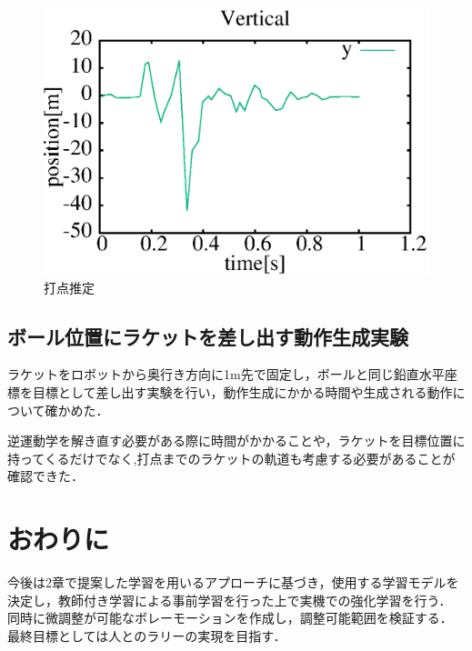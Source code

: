 \documentclass[twocolumn]{preport}
\begin{document}
\begin{figure}[tbh]
\begin{center}
\begin{minipage}{0.35\columnwidth}
   \includegraphics[width=\columnwidth]{est_y_316.eps}
   \caption{打点推定}
   \label{figure:est_graph}
  \end{minipage}
 \end{center}
\end{figure}


\subsection{ボール位置にラケットを差し出す動作生成実験}
ラケットをロボットから奥行き方向に1m先で固定し，ボールと同じ鉛直水平座標を目標として差し出す実験を行い，動作生成にかかる時間や生成される動作について確かめた．

逆運動学を解き直す必要がある際に時間がかかることや，ラケットを目標位置に持ってくるだけでなく,打点までのラケットの軌道も考慮する必要があることが確認できた．


\section{おわりに}
今後は2章で提案した学習を用いるアプローチに基づき，使用する学習モデルを決定し，教師付き学習による事前学習を行った上で実機での強化学習を行う．
同時に微調整が可能なボレーモーションを作成し，調整可能範囲を検証する．
最終目標としては人とのラリーの実現を目指す．


\small


\end{document}
